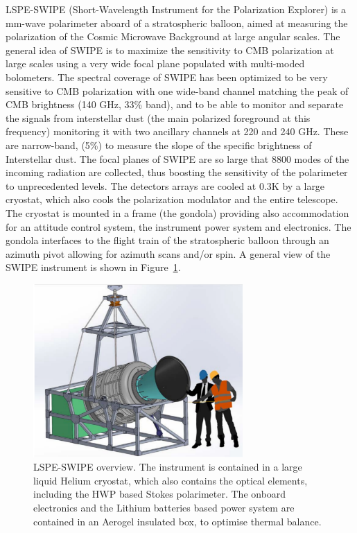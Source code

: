 LSPE-SWIPE (Short-Wavelength Instrument for the Polarization Explorer) 
is a mm-wave polarimeter aboard of a 
stratospheric balloon, aimed at measuring the polarization 
of the Cosmic Microwave Background at large angular scales. 
The general idea of SWIPE is to maximize the sensitivity to CMB 
polarization at large scales using a very wide focal plane populated 
with multi-moded bolometers. The spectral coverage of SWIPE has 
been optimized to be very sensitive to CMB polarization with one 
wide-band channel matching the peak of CMB brightness (140 GHz, 
33\% band), and to be able to monitor and separate the signals from 
interstellar dust (the main polarized foreground at this frequency) 
monitoring it with two ancillary channels at 220 and 240 GHz. These 
are narrow-band, (5\%) to measure the slope of the specific brightness 
of Interstellar dust. 
The focal planes of SWIPE are so large that 8800 modes of the 
incoming radiation are collected, thus boosting the sensitivity of the 
polarimeter to unprecedented levels. The detectors arrays are cooled 
at 0.3K by a large cryostat, which also cools the polarization modulator 
and the entire telescope. The cryostat is mounted in a frame (the gondola) 
providing also accommodation for an attitude control system, the 
instrument power system and electronics. The gondola interfaces 
to the flight train of the stratospheric balloon through an azimuth pivot 
allowing for azimuth scans and/or spin. 
A general view of the SWIPE instrument is shown in Figure~\ref{fig:swipe_overview}.
   \begin{figure}[h!]
   \centering
   \includegraphics[width=8cm]{figs/swipe_overview.pdf}
   \caption{LSPE-SWIPE overview. The instrument is contained in a large 
   liquid Helium cryostat, which also contains the optical elements, including
   the HWP based Stokes polarimeter. The onboard electronics and the 
   Lithium batteries based power system are contained in an Aerogel 
   insulated box, to optimise thermal balance.  
  }
              \label{fig:swipe_overview}%
    \end{figure}

